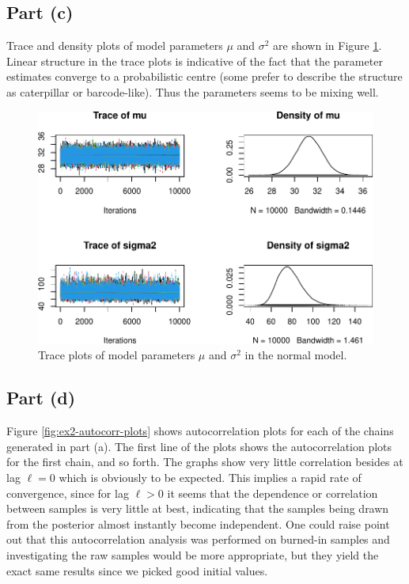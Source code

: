 \documentclass[
]{homework}
\begin{document}
\subsection{Part (c)}\label{part-c-1}

Trace and density plots of model parameters \(\mu\) and \(\sigma^2\) are shown in Figure \ref{fig:ex2-trace-plots}. Linear structure in the trace plots is indicative of the fact that the parameter estimates converge to a probabilistic centre (some prefer to describe the
structure as caterpillar or barcode-like). Thus the parameters seems to be mixing well.

\begin{figure}

{\centering \includegraphics[width=0.7\linewidth]{finalexam_files/figure-latex/ex2-trace-plots-1} 

}

\caption{Trace plots of model parameters $\mu$ and $\sigma^2$ in the normal model.}\label{fig:ex2-trace-plots}
\end{figure}
\newpage

\subsection{Part (d)}\label{part-d}

Figure \ref{fig:ex2-autocorr-plots} shows autocorrelation plots for each of the chains generated in part (a).
The first line of the plots shows the autocorrelation plots for the first chain, and so forth. The graphs show very little
correlation besides at lag \(\ell = 0\) which is obviously to be expected. This implies a rapid rate of convergence, since for
lag \(\ell > 0\) it seems that the dependence or correlation between samples is very little at best, indicating that the samples
being drawn from the posterior almost instantly become independent. One could raise point out that this autocorrelation analysis
was performed on burned-in samples and investigating the raw samples would be more appropriate, but they yield the exact same
results since we picked good initial values.
\end{document}
